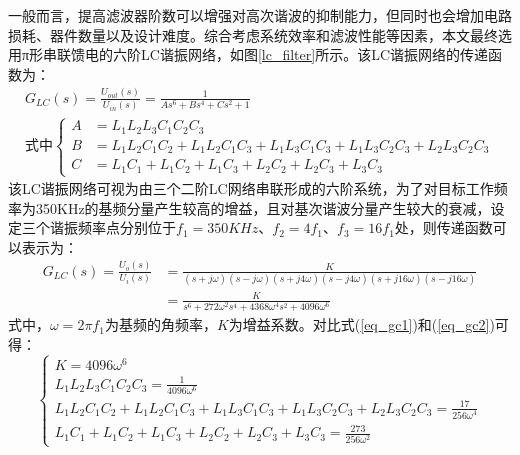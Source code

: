一般而言，提高滤波器阶数可以增强对高次谐波的抑制能力，但同时也会增加电路损耗、器件数量以及设计难度。综合考虑系统效率和滤波性能等因素，本文最终选用π形串联馈电的六阶LC谐振网络，如图\ref{lc_filter}所示。该LC谐振网络的传递函数为：
\begin{equation}
	\begin{gathered}
		G_{LC}(s)=\frac{U_{out}(s)}{U_{in}(s)}=\frac{1}{As^6 + Bs^4 + Cs^2 + 1} \\
		\text{式中}
		\left\{
		\begin{aligned}
			A & = L_1L_2L_3C_1C_2C_3                                                 \\
			B & = L_1L_2C_1C_2 + L_1L_2C_1C_3 + L_1L_3C_1C_3
			+ L_1L_3C_2C_3 + L_2L_3C_2C_3                                            \\
			C & = L_1C_1 + L_1C_2 + L_1C_3 + L_2C_2 + L_2C_3 + L_3C_3 \label{eq_gc1}
		\end{aligned}
		\right.
	\end{gathered}
\end{equation}
该LC谐振网络可视为由三个二阶LC网络串联形成的六阶系统，为了对目标工作频率为350KHz的基频分量产生较高的增益，且对基次谐波分量产生较大的衰减，设定三个谐振频率点分别位于$f_1 = 350KHz$、$f_2 = 4f_1$、$f_3 = 16f_1$处，则传递函数可以表示为：
\begin{equation}
	\begin{aligned}
		G_{LC}(s) = \frac{U_o(s)}{U_i(s)} & = \frac{K}{(s+j\omega)(s-j\omega)(s+j4\omega)(s-j4\omega)(s+j16\omega)(s-j16\omega)}   \\
		                                  & = \frac{K}{s^{6}+272\omega^{2}s^{4}+4368\omega^{4}s^{2}+4096\omega^{6}} \label{eq_gc2}
	\end{aligned}
\end{equation}
式中，$\omega = 2\pi f_1$为基频的角频率，$K$为增益系数。对比式(\ref{eq_gc1})和(\ref{eq_gc2})可得：
\begin{equation}
	\begin{cases}
		K = 4096\omega^{6}                            \\
		L_1L_2L_3C_1C_2C_3 = \frac{1}{4096\omega^{6}} \\
		L_1L_2C_1C_2 + L_1L_2C_1C_3 + L_1L_3C_1C_3 + L_1L_3C_2C_3 + L_2L_3C_2C_3    \label{eq_lcvalue}
		= \frac{17}{256\omega^{4}}                    \\
		L_1C_1 + L_1C_2 + L_1C_3 + L_2C_2 + L_2C_3 + L_3C_3
		= \frac{273}{256\omega^{2}}
	\end{cases}
\end{equation}

